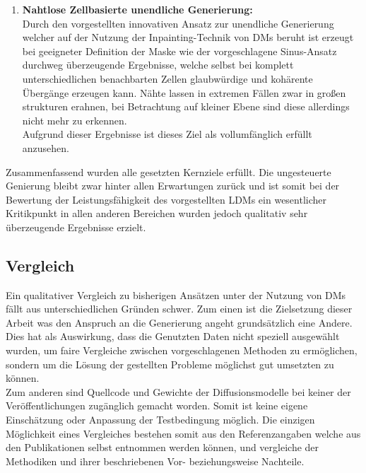 \begin{enumerate}
    \item \textbf {Nahtlose Zellbasierte unendliche Generierung:} \\
    Durch den vorgestellten innovativen Ansatz zur unendliche Generierung welcher auf der Nutzung der Inpainting-Technik von DMs beruht ist erzeugt bei geeigneter Definition der Maske wie der vorgeschlagene Sinus-Ansatz durchweg überzeugende Ergebnisse, welche selbst bei komplett unterschiedlichen benachbarten Zellen glaubwürdige und kohärente Übergänge erzeugen kann. Nähte lassen in extremen Fällen zwar in großen strukturen erahnen, bei Betrachtung auf kleiner Ebene sind diese allerdings nicht mehr zu erkennen. \\
    Aufgrund dieser Ergebnisse ist dieses Ziel als vollumfänglich erfüllt anzusehen.     

\end{enumerate}
Zusammenfassend wurden alle gesetzten Kernziele erfüllt. Die ungesteuerte Genierung bleibt zwar hinter allen Erwartungen zurück und ist somit bei der Bewertung der Leistungsfähigkeit des vorgestellten LDMs ein wesentlicher Kritikpunkt in allen anderen Bereichen wurden jedoch qualitativ sehr überzeugende Ergebnisse erzielt. 
 
\subsection{Vergleich}

Ein qualitativer Vergleich zu bisherigen Ansätzen unter der Nutzung von DMs fällt aus unterschiedlichen Gründen schwer. Zum einen ist die Zielsetzung dieser Arbeit was den Anspruch an die Generierung angeht grundsätzlich eine Andere. Dies hat als Auswirkung, dass die Genutzten Daten nicht speziell ausgewählt wurden, um faire Vergleiche zwischen vorgeschlagenen Methoden zu ermöglichen, sondern um die Lösung der gestellten Probleme möglichst gut umsetzten zu können. \\
Zum anderen sind Quellcode und Gewichte der Diffusionsmodelle bei keiner der Veröffentlichungen zugänglich gemacht worden. Somit ist keine eigene Einschätzung oder Anpassung der Testbedingung möglich. Die einzigen Möglichkeit eines Vergleiches bestehen somit aus den Referenzangaben welche aus den Publikationen selbst entnommen werden können, und vergleiche der Methodiken und ihrer beschriebenen Vor- beziehungsweise Nachteile. 




